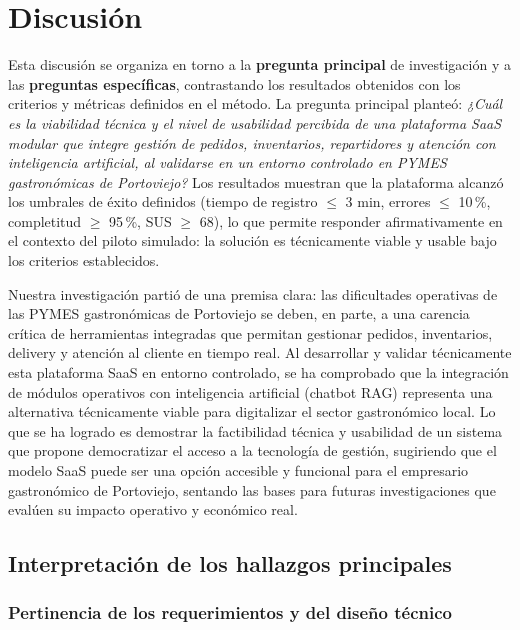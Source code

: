 \chapter{Discusión}

Esta discusión se organiza en torno a la \textbf{pregunta principal} de investigación y a las \textbf{preguntas específicas}, contrastando los resultados obtenidos con los criterios y métricas definidos en el método. La pregunta principal planteó: \textit{¿Cuál es la viabilidad técnica y el nivel de usabilidad percibida de una plataforma SaaS modular que integre gestión de pedidos, inventarios, repartidores y atención con inteligencia artificial, al validarse en un entorno controlado en PYMES gastronómicas de Portoviejo?} Los resultados muestran que la plataforma alcanzó los umbrales de éxito definidos (tiempo de registro $\leq$ 3 min, errores $\leq$ 10\,\%, completitud $\geq$ 95\,\%, SUS $\geq$ 68), lo que permite responder afirmativamente en el contexto del piloto simulado: la solución es técnicamente viable y usable bajo los criterios establecidos.

Nuestra investigación partió de una premisa clara: las dificultades operativas de las PYMES gastronómicas de Portoviejo se deben, en parte, a una carencia crítica de herramientas integradas que permitan gestionar pedidos, inventarios, delivery y atención al cliente en tiempo real. Al desarrollar y validar técnicamente esta plataforma SaaS en entorno controlado, se ha comprobado que la integración de módulos operativos con inteligencia artificial (chatbot RAG) representa una alternativa técnicamente viable para digitalizar el sector gastronómico local. Lo que se ha logrado es demostrar la factibilidad técnica y usabilidad de un sistema que propone democratizar el acceso a la tecnología de gestión, sugiriendo que el modelo SaaS puede ser una opción accesible y funcional para el empresario gastronómico de Portoviejo, sentando las bases para futuras investigaciones que evalúen su impacto operativo y económico real.

\section{Interpretación de los hallazgos principales}

\subsection{Pertinencia de los requerimientos y del diseño técnico}

